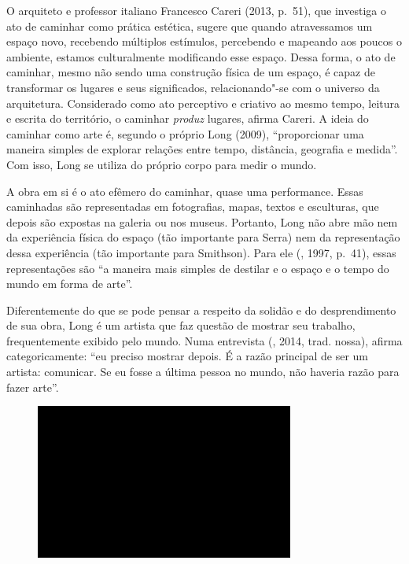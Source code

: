 O arquiteto e professor italiano Francesco Careri (2013, p.~51), que
investiga o ato de caminhar como prática estética, sugere que quando
atravessamos um espaço novo, recebendo múltiplos estímulos, percebendo e
mapeando aos poucos o ambiente, estamos culturalmente modificando esse
espaço. Dessa forma, o ato de caminhar, mesmo não sendo uma construção
física de um espaço, é capaz de transformar os lugares e seus
significados, relacionando"-se com o universo da arquitetura. Considerado
como ato perceptivo e criativo ao mesmo tempo, leitura e escrita do
território, o caminhar \emph{produz} lugares, afirma Careri. A ideia do
caminhar como arte é, segundo o próprio Long (2009), ``proporcionar uma
maneira simples de explorar relações entre tempo, distância, geografia e
medida''. Com isso, Long se utiliza do próprio corpo para medir o mundo.

A obra em si é o ato efêmero do caminhar, quase uma performance. Essas
caminhadas são representadas em fotografias, mapas, textos e esculturas,
que depois são expostas na galeria ou nos museus. Portanto, Long não
abre mão nem da experiência física do espaço (tão importante para Serra)
nem da representação dessa experiência (tão importante para Smithson).
Para ele (, 1997, p.~41), essas representações são ``a
maneira mais simples de destilar e o espaço e o tempo do mundo em forma
de arte''.

Diferentemente do que se pode pensar a respeito da solidão e do
desprendimento de sua obra, Long é um artista que faz questão de mostrar
seu trabalho, frequentemente exibido pelo mundo. Numa entrevista
(, 2014, trad. nossa), afirma categoricamente: ``eu preciso
mostrar depois. É a razão principal de ser um artista: comunicar. Se eu
fosse a última pessoa no mundo, não haveria razão para fazer arte''.

\begin{figure}[!ht]
\centering
 \includegraphics[width=85mm]{./imgs/im1.jpg}
\caption{\tiny{}}
\end{figure}

